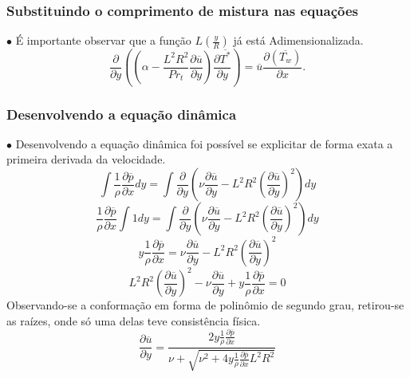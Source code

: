 \documentclass[xcolor=dvipsnames,10pt,aspectratio=169]{beamer}
\begin{document}
		
		
		
		
		\begin{frame}
			\frametitle{Substituindo o comprimento de mistura nas equações}
			$\bullet$ É importante observar que a função $ L(\frac{y}{R}) $ já está Adimensionalizada.
				\begin{equation}
				{\frac{\partial{}}{\partial{y}}} \left( \left( \alpha   
				- \frac{{L}^2 R ^2}{Pr_t}\frac{\partial \overline{u}}{\partial y} \right) \frac{\partial \overline{T^\ast}}{\partial y} \right)
				= 
				\overline{u}\frac{\partial{}\left(\overline{T_w}\right)  }{\partial{x}}.
				\end{equation}
		\end{frame}
		
		
		
		
		
		\begin{frame}
			\frametitle{Desenvolvendo a equação dinâmica}
			$\bullet$ Desenvolvendo a equação dinâmica foi possível se explicitar de forma exata a primeira derivada da velocidade.
			\begin{equation}
			\int \frac{1}{\rho} \frac{\partial \overline{p}}{\partial x} dy = \int \frac{\partial}{\partial y} \left( \nu  \frac{\partial \overline{u}}{\partial y} - {L}^2 R ^2 \left(\frac{\partial \overline{u}}{\partial y}\right) ^ 2 \right) dy  
			\end{equation}
			\begin{equation}
			\frac{1}{\rho} \frac{\partial \overline{p}}{\partial x} \int 1 dy = \int \frac{\partial}{\partial y} \left( \nu  \frac{\partial \overline{u}}{\partial y} - {L}^2 R ^2 \left(\frac{\partial \overline{u}}{\partial y}\right) ^ 2 \right) dy  
			\end{equation}
			\begin{equation}
			y \frac{1}{\rho} \frac{\partial \overline{p}}{\partial x} =  \nu  \frac{\partial \overline{u}}{\partial y} - {L}^2 R ^2 \left(\frac{\partial \overline{u}}{\partial y}\right) ^ 2 
			\end{equation}
			\begin{equation}
			{L}^2 R ^2 \left(\frac{\partial \overline{u}}{\partial y}\right) ^ 2 - \nu  \frac{\partial \overline{u}}{\partial y} + y \frac{1}{\rho} \frac{\partial \overline{p}}{\partial x} = 0
			\end{equation}
			Observando-se a conformação em forma de polinômio de segundo grau, retirou-se as raízes, onde só uma delas teve consistência física.
			\begin{equation}
			\frac{\partial \overline{u}}{\partial y} = \frac{2 y \frac{1}{\rho}\frac{\partial \overline{p}}{\partial x} }{ \nu + \sqrt{\nu ^2 + 4 y \frac{1}{\rho} \frac{\partial \overline{p}}{\partial x} L ^2 R ^2}}
			\end{equation}
		\end{frame}
			
\end{document}
